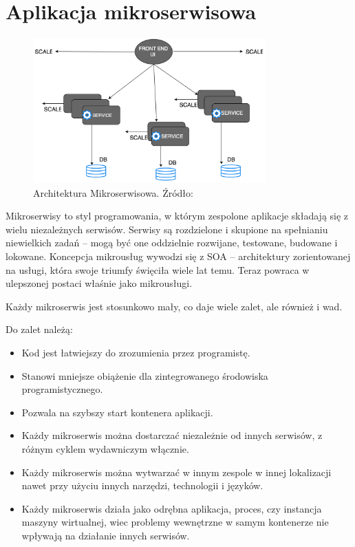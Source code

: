 \section{Aplikacja mikroserwisowa}
\begin{figure}[h!]
  \centering
    \includegraphics[width=0.8\textwidth]{images/microservice-arch.png}
  \caption{Architektura Mikroserwisowa. Źródło: \cite{MonolitVsMicro} }
\end{figure}
Mikroserwisy to styl programowania, w którym zespolone aplikacje składają się z wielu niezależnych serwisów. Serwisy są rozdzielone i skupione na spełnianiu niewielkich zadań – mogą być one oddzielnie rozwijane, testowane, budowane i lokowane. Koncepcja mikrousług wywodzi się z SOA – architektury zorientowanej na usługi, która swoje triumfy święciła wiele lat temu. Teraz powraca w ulepszonej postaci właśnie jako mikrousługi.\cite{Micro1}

Każdy mikroserwis jest stosunkowo mały, co daje wiele zalet, ale również i wad.

Do zalet \cite{Micro2} należą:
\begin{itemize}
    \item Kod jest łatwiejszy do zrozumienia przez programistę.
    \item Stanowi mniejsze obiążenie dla zintegrowanego środowiska programistycznego.
    \item Pozwala na szybszy start kontenera aplikacji.
    \item Każdy mikroserwis można dostarczać niezależnie od innych serwisów, z różnym cyklem wydawniczym włącznie.
    \item Każdy mikroserwis można wytwarzać w innym zespole w innej lokalizacji nawet przy użyciu innych narzędzi, technologii i języków.
    \item Każdy mikroserwis działa jako odrębna aplikacja, proces, czy instancja maszyny wirtualnej, wiec problemy wewnętrzne w samym kontenerze nie wpływają na działanie innych serwisów.
\end{itemize}

